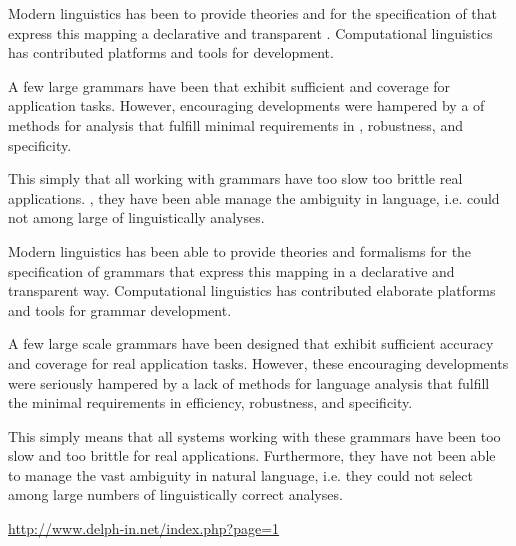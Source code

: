 \documentclass[a4paper,landscape,headrule,footrule,xetex]{foils}
\begin{document}
\newcommand{\cz}[1]{\hspace*{3em}}

Modern linguistics has been \cz{able} to provide theories and \cz{formalisms}
for the specification of \cz{grammars} that express this mapping \cz{in} a
declarative and transparent \cz{way}. Computational linguistics has
contributed \cz{elaborate} platforms and tools for \cz{grammar} development.

A few large \cz{scale} grammars have been \cz{designed} that exhibit sufficient
\cz{accuracy} and coverage for \cz{real} application tasks. However,\cz{ these}
encouraging developments were \cz{seriously} hampered by a \cz{lack} of methods
for \cz{language} analysis that fulfill \cz{the} minimal requirements in
\cz{efficiency}, robustness, and specificity.

This simply \cz{means} that all \cz{systems} working with \cz{these} grammars have
\cz{been} too slow \cz{and} too brittle \cz{for} real applications. \cz{Furthermore}, they
have \cz{not} been able \cz{to} manage the \cz{vast} ambiguity in \cz{natural} language,
i.e. \cz{they} could not \cz{select} among large \cz{numbers} of linguistically
\cz{correct} analyses.

Modern linguistics has been {able} to provide theories and {formalisms}
for the specification of {grammars} that express this mapping {in} a
declarative and transparent {way}. Computational linguistics has
contributed {elaborate} platforms and tools for {grammar} development.

A few large scale grammars have been designed that exhibit sufficient
accuracy and coverage for real application tasks. However, these
encouraging developments were seriously hampered by a lack of methods
for language analysis that fulfill the minimal requirements in
efficiency, robustness, and specificity.

This simply means that all systems working with these grammars have
been too slow and too brittle for real applications. Furthermore, they
have not been able to manage the vast ambiguity in natural language,
i.e. they could not select among large numbers of linguistically
correct analyses.

\url{http://www.delph-in.net/index.php?page=1}



\end{document}
